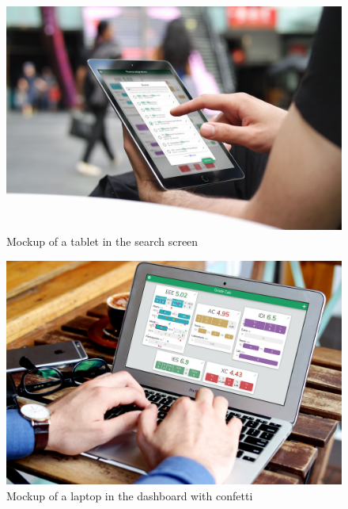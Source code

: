 \begin{figure}[ht!]
    \center
    \includegraphics[width=0.85\columnwidth]{media/mockups/mockup-tablet-search.jpg}
    \caption{Mockup of a tablet in the search screen}
    \label{fig:mockup-phone-home}
\end{figure}
\vfill
\begin{figure}[ht!]
    \center
    \includegraphics[width=0.85\columnwidth]{media/mockups/mockup-laptop.jpg}
    \caption{Mockup of a laptop in the dashboard with confetti}
    \label{fig:mockup-phone-home}
\end{figure}
